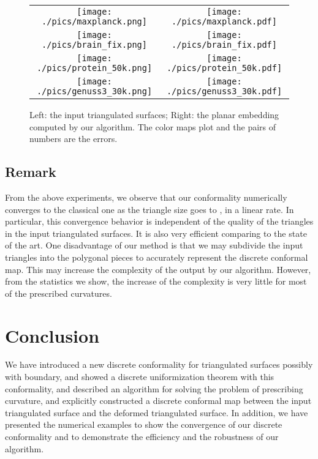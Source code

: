 \documentclass[11pt]{article}
\begin{document}
\begin{figure}[!t]
\begin{center}
\begin{tabular}{cc}
\texttt{[image: ./pics/maxplanck.png]} & 
\texttt{[image: ./pics/maxplanck.pdf]} \\
\texttt{[image: ./pics/brain\_fix.png]} & 
\texttt{[image: ./pics/brain\_fix.pdf]} \\
\texttt{[image: ./pics/protein\_50k.png]} & 
\texttt{[image: ./pics/protein\_50k.pdf]} \\
\texttt{[image: ./pics/genuss3\_30k.png]} & 
\texttt{[image: ./pics/genuss3\_30k.pdf]} \\
\end{tabular}
\end{center}
\caption{Left: the input triangulated surfaces; Right: the planar embedding 
computed by our algorithm. The color maps plot  and the pairs of numbers
are the  errors. 
\label{fig:more_examples}}
\end{figure}


\subsection{Remark}
From the above experiments, we observe that our conformality numerically converges
to the classical one as the triangle size goes to , in a linear rate. In particular, 
this convergence behavior is independent of the quality of the triangles in the
input triangulated surfaces. It is also very efficient comparing to the state of the art. 
One disadvantage of our method is that we may subdivide the input triangles into the
polygonal pieces to accurately represent the discrete conformal map. This may increase
the complexity of the output by our algorithm. However, from the statistics we show,
the increase of the complexity is very little for most of the prescribed curvatures. 


\section{Conclusion}
We have introduced a new discrete conformality for triangulated surfaces possibly
with boundary, and showed a discrete uniformization theorem with this conformality, 
and described an algorithm for solving the problem of prescribing curvature, and 
explicitly constructed a discrete conformal map between the input triangulated surface
and the deformed triangulated surface.  
In addition, we have presented the numerical examples to show the convergence of 
our discrete conformality and to demonstrate the efficiency and the robustness
of our algorithm.
\end{document}
